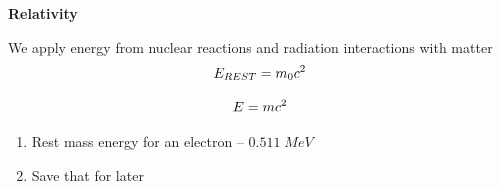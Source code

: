 \documentclass[aspectratio=1610,pdftex,dvipsnames,compress,xcolor={dvipsnames}]{beamer}
\begin{document}
\begin{frame}[plain]{}
    \centering\LARGE\textbf{Relativity}
\end{frame}


\addtocounter{framenumber}{-1}
\begin{frame}{We apply energy from nuclear reactions and radiation interactions with matter}
    \begin{equation}
        \LARGE
        E_{REST} = m_0 c^2
    \end{equation}

    \begin{equation}
        \LARGE
        E = m c^2
    \end{equation}

    \vspace*{\fill}

    \begin{enumerate}[series=outerlist,topsep=0pt,itemsep=21pt,leftmargin=*,label=(\arabic*)]
        \item[]Rest mass energy for an electron -- $0.511 \; MeV$
        \item[]Save that for later
    \end{enumerate}
\end{frame}
\end{document}
